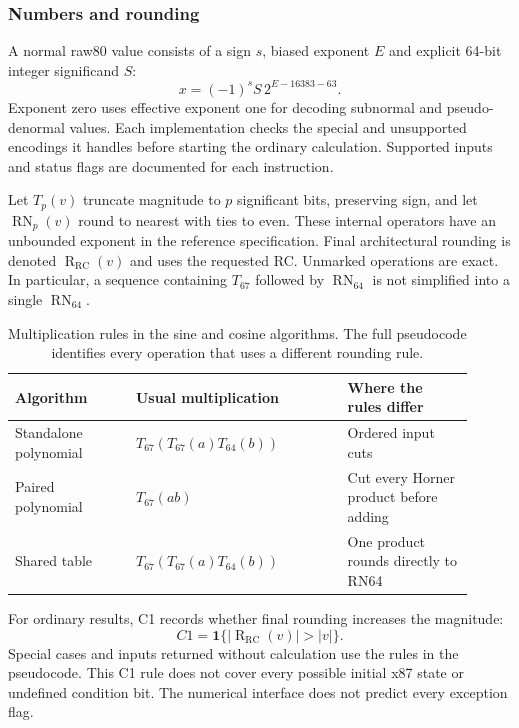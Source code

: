 \documentclass[11pt]{article}
\newcommand{\N}[1]{\operatorname{RN}_{#1}}
\newcommand{\R}{\operatorname{R}_{\mathrm{RC}}}
\begin{document}
\subsubsection{Numbers and rounding}

A normal raw80 value consists of a sign $s$, biased exponent $E$ and explicit
64-bit integer significand $S$:
\begin{equation}
x=(-1)^s S\,2^{E-16383-63}.
\end{equation}
Exponent zero uses effective exponent one for decoding subnormal and
pseudo-denormal values. Each implementation checks the special and unsupported encodings it handles
before starting the ordinary calculation. Supported inputs and status flags
are documented for each instruction.

Let $T_p(v)$ truncate magnitude to $p$ significant bits, preserving sign,
and let $\N{p}(v)$ round to nearest with ties to even. These internal
operators have an unbounded exponent in the reference specification.
Final architectural rounding is denoted $\R(v)$ and uses the requested RC.
Unmarked operations are exact. In particular, a sequence containing
$T_{67}$ followed by $\N{64}$ is not simplified into a single $\N{64}$.

\begin{table}[ht]
\centering\small
\begin{tabular}{@{}>{\raggedright\arraybackslash}p{0.24\linewidth}>{\raggedright\arraybackslash}p{0.42\linewidth}>{\raggedright\arraybackslash}p{0.25\linewidth}@{}}
\toprule
Algorithm & Usual multiplication & Where the rules differ\\
\midrule
Standalone polynomial & $T_{67}(T_{67}(a)T_{64}(b))$ & Ordered input cuts\\
Paired polynomial & $T_{67}(ab)$ & Cut every Horner product before adding\\
Shared table & $T_{67}(T_{67}(a)T_{64}(b))$ & One product rounds directly to RN64\\
\bottomrule
\end{tabular}
\caption{Multiplication rules in the sine and cosine algorithms. The full pseudocode
identifies every operation that uses a different rounding rule.}
\label{tab:operators}
\end{table}

For ordinary results, C1 records whether final rounding increases the magnitude:
\begin{equation}
 C1=\mathbf{1}\{|\R(v)|>|v|\}.
\end{equation}
Special cases and inputs returned without calculation use the rules in the
pseudocode. This C1 rule does not cover every possible initial x87 state or
undefined condition bit. The numerical interface does not predict every
exception flag.
\end{document}
